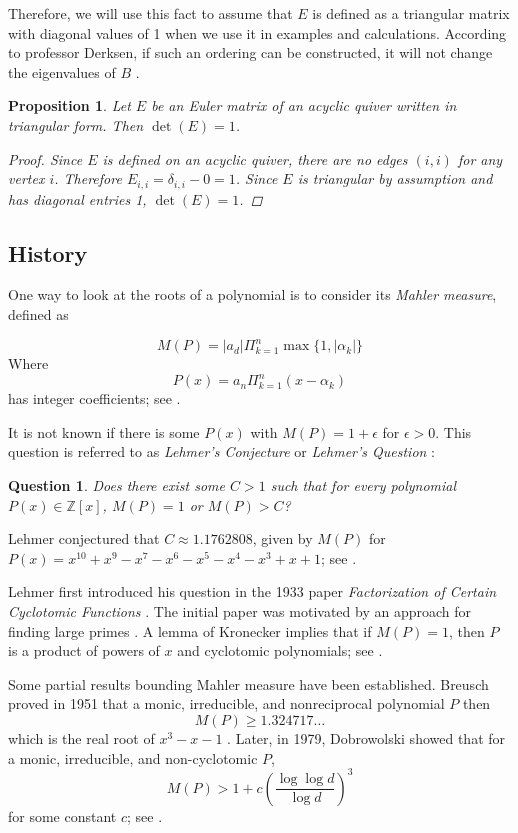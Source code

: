 \documentclass{amsart}
\theoremstyle{theorem}
\theoremstyle{theorem*}
\newtheorem{proposition}[theorem]{Proposition}
\newtheorem{question}[theorem]{Question}
\theoremstyle{definition}
\begin{document}
Therefore, we will use this fact to assume that $E$ is defined as a
triangular matrix with diagonal values of 1
when we use it in examples and calculations. According
to professor Derksen, if such an ordering can be constructed, it will
not change the eigenvalues of $B$ \cite{dp}.

\begin{proposition}
    Let $E$ be an Euler matrix of an acyclic quiver written in triangular form.
    Then $\det(E) = 1$.
    \begin{proof}
        Since $E$ is defined on an acyclic quiver, there are no edges $(i, i)$
        for any vertex $i$. Therefore $E_{i,i} = \delta_{i,i} - 0 = 1$. Since $E$
        is triangular by assumption and has diagonal entries 1, $\det(E) = 1$.
    \end{proof}
\end{proposition}

\subsection{History}

One way to look at the roots of a polynomial is to consider its \textit{Mahler measure},
defined as

$$M(P) = |a_d|\Pi_{k=1}^{n}\max\{1, |\alpha_k|\}$$
Where
$$P(x) = a_n \Pi_{k=1}^{n} (x - \alpha_k)$$
has integer coefficients; see \cite{m}.

It is not known if there is some $P(x)$ with $M(P) = 1 + \epsilon$
for $\epsilon > 0$. This question is referred to as \textit{Lehmer's Conjecture} or \textit{Lehmer's Question} \cite{m}:
\begin{question} Does there exist some $C > 1$ such that for every polynomial
    $P(x) \in \mathbb{Z}[x]$, $M(P) = 1$ or $M(P) > C$?
\end{question}
Lehmer conjectured that $C \approx 1.1762808$, given by $M(P)$ for $P(x) =
    x^{10} + x^9 - x^7 - x^6 - x^5 - x^4 - x^3 + x + 1$; see \cite{m}.

Lehmer first introduced his question in the 1933 paper \textit{Factorization of
    Certain Cyclotomic Functions} \cite{l}. The initial paper was motivated by
an approach for finding large primes \cite{ln}. A lemma of Kronecker implies
that if $M(P) = 1$, then $P$ is a product of powers of $x$ and cyclotomic
polynomials; see \cite{ln}.

Some partial results bounding Mahler measure have been established. Breusch
proved in 1951 that a monic, irreducible, and nonreciprocal polynomial $P$ then
$$M(P) \geq 1.324717\dots$$ which is the real root of $x^3 - x - 1$ \cite{ln}.
Later, in 1979, Dobrowolski showed that for a monic, irreducible, and
non-cyclotomic $P$,
$$M(P) > 1 + c \left(\frac{\log \log d}{\log d}\right)^3$$ for some constant $c$;
see \cite{ln}.
\end{document}

